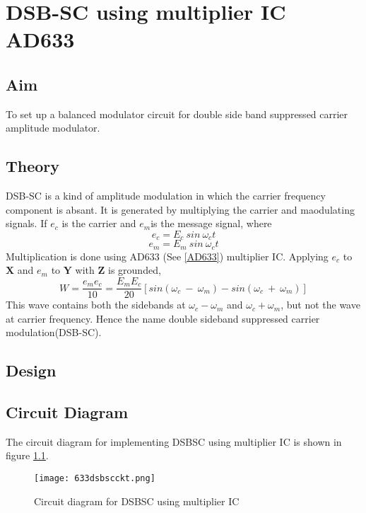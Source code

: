 \chapter[DSB-SC using multiplier IC AD633]{DSB-SC using multiplier IC AD633}
\section*{Aim}
To set up a balanced modulator circuit for double side band suppressed carrier amplitude modulator.
\section*{Theory}
DSB-SC is a kind of amplitude modulation in which the carrier frequency component is absant. It is generated by multiplying the carrier and maodulating signals. If $e_c$ is the carrier and $e_m$is the message signal, where
\begin{equation}
e_c=E_c\  sin\ \omega_ct
\end{equation}
\begin{equation}
e_m=E_m\  sin\ \omega_ct
\end{equation}
Multiplication is done using AD633 (See \ref{AD633}) multiplier IC.
Applying $e_c$ to $\textbf{X}$ and $e_m$ to $\textbf{Y}$ with $\textbf{Z}$ is grounded, 
\begin{equation}
W= \frac{e_me_c}{10} = \frac{E_mE_c}{20} [sin (\omega_c\ -\ \omega_m)-sin (\omega_c\ +\ \omega_m)]
\end{equation}
This wave contains both the sidebands at $\omega_c-\omega_m$ and $\omega_c+\omega_m$, but not the wave at carrier frequency. Hence the name double sideband suppressed carrier modulation(DSB-SC).
\section*{Design}
\section*{Circuit Diagram}
The circuit diagram for implementing DSBSC using multiplier IC is shown in figure \ref{DSBSCckt}.
\begin{figure}[h]
\begin{center}
\texttt{[image: 633dsbscckt.png]}
\caption{Circuit diagram for DSBSC using multiplier IC}
\label{DSBSCckt}
\end{center}

\end{figure}

